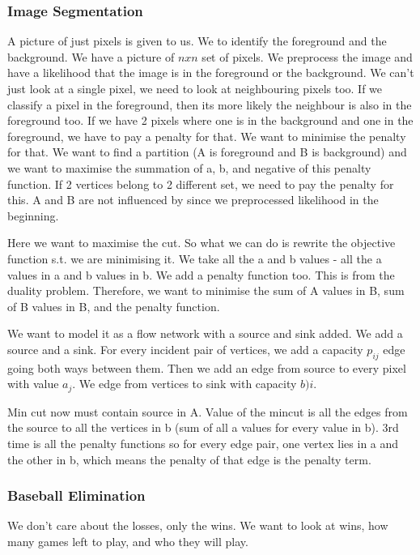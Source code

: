 \documentclass[11pt, oneside]{article}
\theoremstyle{definition}
\begin{document}
\subsubsection{Image Segmentation}
A picture of just pixels is given to us. We to identify the foreground and the background. We have a picture of $nxn$ set of pixels. We preprocess the image and have a likelihood that the image is in the foreground or the background. We can't just look at a single pixel, we need to look at neighbouring pixels too. If we classify a pixel in the foreground, then its more likely the neighbour is also in the foreground too. If we have 2 pixels where one is in the background and one in the foreground, we have to pay a penalty for that. We want to minimise the penalty for that. We want to find a partition (A is foreground and B is background) and we want to maximise the summation of a, b, and negative of this penalty function. If 2 vertices belong to 2 different set, we need to pay the penalty for this. A and B are not influenced by since we preprocessed likelihood in the beginning.

Here we want to maximise the cut. So what we can do is rewrite the objective function s.t. we are minimising it. We take all the a and b values - all the a values in a and b values in b. We add a penalty function too. This is from the duality problem. Therefore, we want to minimise the sum of A values in B, sum of B values in B, and the penalty function.

We want to model it as a flow network with a source and sink added. We add a source and a sink. For every incident pair of vertices, we add a capacity $p_{ij}$ edge going both ways between them. Then we add an edge from source to every pixel with value $a_j$. We edge from vertices to sink with capacity $b)i$.

Min cut now must contain source in A. Value of the mincut is all the edges from the source to all the vertices in b (sum of all a values for every value in b). 3rd time is all the penalty functions so for every edge pair, one vertex lies in a and the other in b, which means the penalty of that edge is the penalty term.

\subsubsection{Baseball Elimination}
We don't care about the losses, only the wins. We want to look at wins, how many games left to play, and who they will play.
\end{document}
